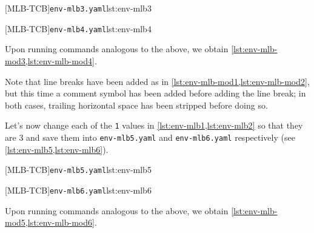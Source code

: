 		\begin{minipage}{.45\textwidth}
			{\texttt{env-mlb3.yaml}}{lst:env-mlb3}
		\end{minipage}
		\hfill
		\begin{minipage}{.45\textwidth}
			{\texttt{env-mlb4.yaml}}{lst:env-mlb4}
		\end{minipage}

		Upon running commands analogous to the above, we obtain
		\cref{lst:env-mlb-mod3,lst:env-mlb-mod4}.

		\begin{widepage}
			\begin{minipage}{.56\linewidth}
			\end{minipage}
			\hfill
			\begin{minipage}{.43\linewidth}
			\end{minipage}
		\end{widepage}

		Note that line breaks have been added as in \cref{lst:env-mlb-mod1,lst:env-mlb-mod2}, but
		this time a comment symbol has been added before adding the line break; in both cases,
		trailing horizontal space has been stripped before doing so.

		Let's  now change each
		of the \texttt{1} values in \cref{lst:env-mlb1,lst:env-mlb2} so that they are $3$ and
		save them into \texttt{env-mlb5.yaml} and \texttt{env-mlb6.yaml} respectively (see
		\cref{lst:env-mlb5,lst:env-mlb6}). %

		\begin{minipage}{.45\textwidth}
			{\texttt{env-mlb5.yaml}}{lst:env-mlb5}
		\end{minipage}
		\hfill
		\begin{minipage}{.45\textwidth}
			{\texttt{env-mlb6.yaml}}{lst:env-mlb6}
		\end{minipage}

		Upon running commands analogous to the above, we obtain
		\cref{lst:env-mlb-mod5,lst:env-mlb-mod6}.

